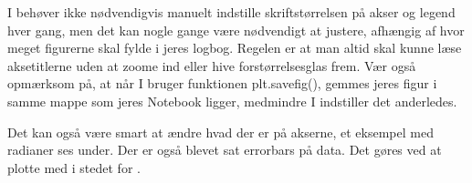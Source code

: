 \documentclass[letterpaper,10pt,english]{jupyterBook}
\begin{document}
\begin{sphinxVerbatim}[commandchars=\\\{\}]
   

      

    
   

   

 

 
\end{sphinxVerbatim}

\noindent{}

I behøver ikke nødvendigvis manuelt indstille skriftstørrelsen på akser og legend hver gang, men det kan nogle gange være nødvendigt at justere, afhængig af hvor meget figurerne skal fylde i jeres logbog. Regelen er at man altid skal kunne læse akse\sphinxhyphen{}titlerne uden at zoome ind eller hive forstørrelsesglas frem. Vær også opmærksom på, at når I bruger funktionen plt.savefig(), gemmes jeres figur i samme mappe som jeres Notebook ligger, medmindre I indstiller det anderledes.

Det kan også være smart at ændre hvad der er på akserne, et eksempel med radianer ses under.
Der er også blevet sat errorbars på data. Det gøres ved at plotte med  i stedet for .
\end{document}
